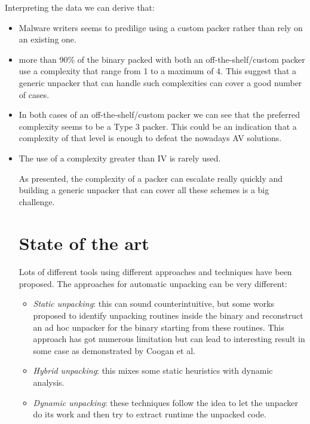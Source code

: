 Interpreting the data we can derive that:
\begin{itemize}
\item Malware writers seems to predilige using a custom packer rather than rely on an existing one.
\item more than 90\% of the binary packed with both an off-the-shelf/custom packer use a complexity that range from 1 to a maximum of 4. This suggest that a generic unpacker that can handle such complexities can cover a good number of cases. 
\item In both cases of an off-the-shelf/custom packer we can see that the preferred complexity seems to be a Type 3 packer. This could be an indication that a complexity of that level is enough to defeat the nowadays AV solutions.
\item The use of a complexity greater than IV is rarely used.

As presented, the complexity of a packer can escalate really quickly and building a generic unpacker that can cover all these schemes is a big challenge.

\section{State of the art}
\paragraph{}
Lots of different tools using different approaches and techniques have been proposed. 
The approaches for automatic unpacking can be very different:
\begin{itemize}
\item \textit{Static unpacking}: this can sound counterintuitive, but some works proposed to identify unpacking routines inside the binary and reconstruct an ad hoc unpacker for the binary starting from these routines. This approach has got numerous limitation but can lead to interesting result in some case as demonstrated by Coogan et al.\cite{coogan}
\item \textit{Hybrid unpacking}: this mixes some static heuristics with dynamic analysis.
\item \textit{Dynamic unpacking}: these techniques follow the idea to let the unpacker do its work and then try to extract runtime the unpacked code. 
\end{itemize}

\end{itemize}
